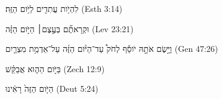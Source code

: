 
\begin{exe}

\ex\label{ex_demon_time1}
\texthebrew{
לִהְיֹ֥ות עֲתִדִ֖ים לַיֹּ֥ום הַזֶּֽה׃ 
} (Esth 3:14)

\ex\label{ex_demon_time2}
\texthebrew{
וּקְרָאתֶ֞ם בְּעֶ֣צֶם׀ הַיֹּ֣ום הַזֶּ֗ה 
} (Lev 23:21)

\ex\label{ex_demon_time3}
\texthebrew{
וַיָּ֣שֶׂם אֹתָ֣הּ יֹוסֵ֡ף לְחֹק֩ עַד־הַיֹּ֨ום הַזֶּ֜ה עַל־אַדְמַ֥ת מִצְרַ֛יִם 
} (Gen 47:26)

\ex\label{ex_demon_time4}
\texthebrew{
בַּיֹּ֣ום הַה֑וּא אֲבַקֵּ֗שׁ 
} (Zech 12:9)

\ex\label{ex_demon_time5}
\texthebrew{
הַיֹּ֤ום הַזֶּה֙ רָאִ֔ינוּ 
} (Deut 5:24)

\end{exe}
